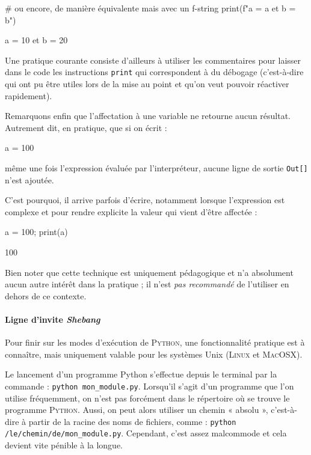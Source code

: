 \begin{nbjupyterin}[before skip=4pt, after skip=2pt]{3}
# ou encore, de manière équivalente mais avec un f-string
print(f"a = {a} et b = {b}")
\end{nbjupyterin}
\begin{nbjupyterout}[before skip=1pt, after skip=4pt]{3}
a = 10 et b = 20
\end{nbjupyterout}

Une pratique courante consiste d'ailleurs à utiliser les commentai\-res pour laisser dans le code les instructions \texttt{print} qui correspondent à du débogage (c'est-à-dire qui ont pu être utiles lors de la mise au point et qu'on veut pouvoir réactiver rapidement).

Remarquons enfin que l'affectation à une variable ne retourne aucun résultat.
Autrement dit, en pratique, que si on écrit :

\begin{nbjupyterin}[before skip=4pt, after skip=4pt]{4}
a = 100
\end{nbjupyterin}
\noindent même une fois l'expression évaluée par l'interpréteur, aucune ligne de sortie \texttt{Out[]} n'est ajoutée.

C'est pourquoi, il arrive parfois d'écrire, notamment lorsque l'expression est complexe et pour rendre explicite la valeur qui vient d'être affectée :

\begin{nbjupyterin}[before skip=4pt, after skip=2pt]{5}
a = 100; print(a)
\end{nbjupyterin}
\begin{nbjupyterout}[before skip=1pt, after skip=6pt]{5}
100
\end{nbjupyterout}

Bien noter que cette technique est uniquement pédagogique et n'a absolument aucun autre intérêt dans la pratique ; il n'est \emph{pas recommandé} de l'utiliser en dehors de ce contexte.

\paragraph*{Ligne d'invite \textit{Shebang}} Pour finir sur les modes d'exécution de \textsc{Python}, une fonctionnalité pratique est à connaître, mais uniquement valable pour les systèmes Unix (\textsc{Linux} et \textsc{MacOSX}).

Le lancement d'un programme Python s'effectue depuis le terminal par la commande : \texttt{python mon\_module.py}.
Lorsqu'il s'agit d'un programme que l'on utilise fréquemment, on n'est pas forcément dans le répertoire où se trouve le programme \textsc{Python}. Aussi, on peut alors utiliser un chemin  « absolu », c'est-à-dire à partir de la racine des noms de fichiers, comme : \texttt{python /le/chemin/de/mon\_module.py}. Cependant, c'est assez malcommode et cela devient vite pénible à la longue.

